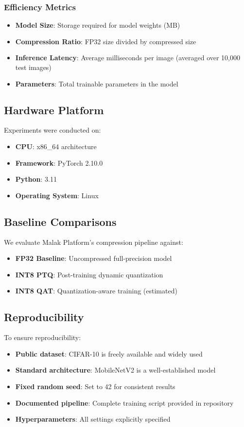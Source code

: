 \subsubsection{Efficiency Metrics}
\begin{itemize}
\item \textbf{Model Size}: Storage required for model weights (MB)
\item \textbf{Compression Ratio}: FP32 size divided by compressed size
\item \textbf{Inference Latency}: Average milliseconds per image (averaged over 10,000 test images)
\item \textbf{Parameters}: Total trainable parameters in the model
\end{itemize}

\subsection{Hardware Platform}

Experiments were conducted on:
\begin{itemize}
\item \textbf{CPU}: x86\_64 architecture
\item \textbf{Framework}: PyTorch 2.10.0
\item \textbf{Python}: 3.11
\item \textbf{Operating System}: Linux
\end{itemize}

\subsection{Baseline Comparisons}

We evaluate Malak Platform's compression pipeline against:
\begin{itemize}
\item \textbf{FP32 Baseline}: Uncompressed full-precision model
\item \textbf{INT8 PTQ}: Post-training dynamic quantization
\item \textbf{INT8 QAT}: Quantization-aware training (estimated)
\end{itemize}

\subsection{Reproducibility}

To ensure reproducibility:
\begin{itemize}
\item \textbf{Public dataset}: CIFAR-10 is freely available and widely used
\item \textbf{Standard architecture}: MobileNetV2 is a well-established model
\item \textbf{Fixed random seed}: Set to 42 for consistent results
\item \textbf{Documented pipeline}: Complete training script provided in repository
\item \textbf{Hyperparameters}: All settings explicitly specified
\end{itemize}


